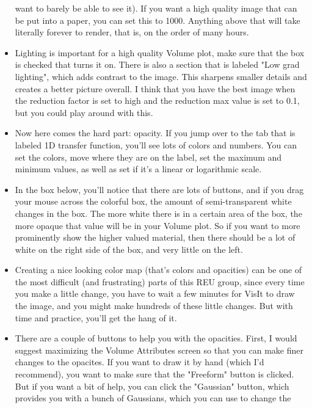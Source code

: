 \documentclass[english]{article}
\begin{document}
\begin{itemize}
              want to barely be able to see it). If you want a high quality image that can be put into a paper, you can set
              this to 1000. Anything above that will take literally forever to render, that is, on the order of many hours.
        \item Lighting is important for a high quality Volume plot, make sure that the box is checked that turns it on. There 
              is also a section that is labeled "Low grad lighting", which adds contrast to the image. This sharpens smaller 
              details and creates a better picture overall. I think that you have the best image when the reduction factor is
              set to high and the reduction max value is set to 0.1, but you could play around with this.
        \item Now here comes the hard part: opacity. If you jump over to the tab that is labeled 1D transfer function, you'll
              see lots of colors and numbers. You can set the colors, move where they are on the label, set the maximum and 
              minimum values, as well as set if it's a linear or logarithmic scale.
        \item In the box below, you'll notice that there are lots of buttons, and if you drag your mouse across the colorful 
              box, the amount of semi-transparent white changes in the box. The more white there is in a certain area of the
              box, the more opaque that value will be in your Volume plot. So if you want to more prominently show the higher
              valued material, then there should be a lot of white on the right side of the box, and very little on the left.
        \item Creating a nice looking color map (that's colors and opacities) can be one of the most difficult (and 
              frustrating) parts of this REU group, since every time you make a little change, you have to wait a few minutes
              for VisIt to draw the image, and you might make hundreds of these little changes. But with time and practice,
              you'll get the hang of it.
        \item There are a couple of buttons to help you with the opacities. First, I would suggest maximizing the Volume 
              Attributes screen so that you can make finer changes to the opacites. If you want to draw it by hand (which I'd
              recommend), you want to make sure that the "Freeform" button is clicked. But if you want a bit of help, you can
              click the "Gaussian" button, which provides you with a bunch of Gaussians, which you can use to change the 

\end{itemize}
\end{document}
